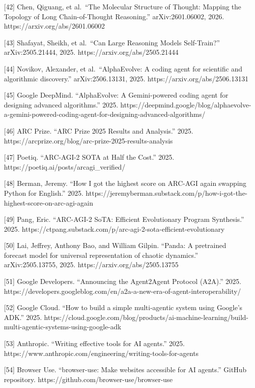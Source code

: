 \documentclass[11pt]{article}
\begin{document}
{[}42{]} Chen, Qiguang, et al.~``The Molecular Structure of Thought: Mapping the Topology of Long Chain-of-Thought Reasoning.'' arXiv:2601.06002, 2026. https://arxiv.org/abs/2601.06002

{[}43{]} Shafayat, Sheikh, et al.~``Can Large Reasoning Models Self-Train?'' arXiv:2505.21444, 2025. https://arxiv.org/abs/2505.21444

{[}44{]} Novikov, Alexander, et al.~``AlphaEvolve: A coding agent for scientific and algorithmic discovery.'' arXiv:2506.13131, 2025. https://arxiv.org/abs/2506.13131

{[}45{]} Google DeepMind. ``AlphaEvolve: A Gemini-powered coding agent for designing advanced algorithms.'' 2025. https://deepmind.google/blog/alphaevolve-a-gemini-powered-coding-agent-for-designing-advanced-algorithms/

{[}46{]} ARC Prize. ``ARC Prize 2025 Results and Analysis.'' 2025. https://arcprize.org/blog/arc-prize-2025-results-analysis

{[}47{]} Poetiq. ``ARC-AGI-2 SOTA at Half the Cost.'' 2025. https://poetiq.ai/posts/arcagi\_verified/

{[}48{]} Berman, Jeremy. ``How I got the highest score on ARC-AGI again swapping Python for English.'' 2025. https://jeremyberman.substack.com/p/how-i-got-the-highest-score-on-arc-agi-again

{[}49{]} Pang, Eric. ``ARC-AGI-2 SoTA: Efficient Evolutionary Program Synthesis.'' 2025. https://ctpang.substack.com/p/arc-agi-2-sota-efficient-evolutionary

{[}50{]} Lai, Jeffrey, Anthony Bao, and William Gilpin. ``Panda: A pretrained forecast model for universal representation of chaotic dynamics.'' arXiv:2505.13755, 2025. https://arxiv.org/abs/2505.13755

{[}51{]} Google Developers. ``Announcing the Agent2Agent Protocol (A2A).'' 2025. https://developers.googleblog.com/en/a2a-a-new-era-of-agent-interoperability/

{[}52{]} Google Cloud. ``How to build a simple multi-agentic system using Google's ADK.'' 2025. https://cloud.google.com/blog/products/ai-machine-learning/build-multi-agentic-systems-using-google-adk

{[}53{]} Anthropic. ``Writing effective tools for AI agents.'' 2025. https://www.anthropic.com/engineering/writing-tools-for-agents

{[}54{]} Browser Use. ``browser-use: Make websites accessible for AI agents.'' GitHub repository. https://github.com/browser-use/browser-use
\end{document}
